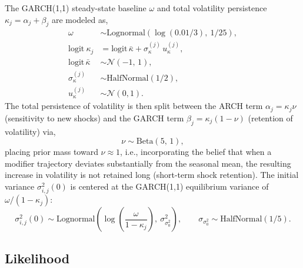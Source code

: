 \documentclass[11pt]{article}
\newcommand{\Normal}{\mathcal{N}}
\newcommand{\Lognormal}{\text{Lognormal}}
\newcommand{\HalfNormal}{\text{HalfNormal}}
\begin{document}
The GARCH(1,1) steady-state baseline $\omega$ and total volatility persistence $\kappa_j = \alpha_j + \beta_j$ are modeled as,
\begin{align}
    \omega &\sim \Lognormal\!\left(\log(0.01/3),\ 1/25\right), \nonumber\\
    \text{logit}~\kappa_j &= \text{logit}\,\bar{\kappa} + \sigma^{(j)}_\kappa\, u^{(j)}_{\kappa},\nonumber\\
    \text{logit}\,\bar{\kappa} &\sim \Normal(-1,\, 1), \nonumber\\
    \sigma^{(j)}_\kappa &\sim \HalfNormal\!\left(1/2\right), \nonumber \\
    u^{(j)}_{\kappa} &\sim \Normal(0,1).
\end{align}
The total persistence of volatility is then split between the ARCH term $\alpha_j = \kappa_j \nu$ (sensitivity to new shocks) and the GARCH term $\beta_j = \kappa_j(1-\nu)$ (retention of volatility) via,
\begin{equation}
    \nu \sim \text{Beta}(5,\, 1),
\end{equation}
placing prior mass toward $\nu \approx 1$, i.e., incorporating the belief that when a modifier trajectory deviates substantially from the seasonal mean, the resulting increase in volatility is not retained long (short-term shock retention). The initial variance $\sigma^2_{i,j}(0)$ is centered at the GARCH(1,1) equilibrium variance of $\omega/(1-\kappa_j)$:
\begin{equation}
    \sigma^2_{i,j}(0) \sim \Lognormal\!\left(\log\!\left(\frac{\omega}{1-\kappa_j}\right),\ \sigma^2_{\sigma^2_0}\right), \qquad \sigma_{\sigma^2_0} \sim \HalfNormal\!\left(1/5\right).
\end{equation}

\subsection*{Likelihood}
 
\end{document}
